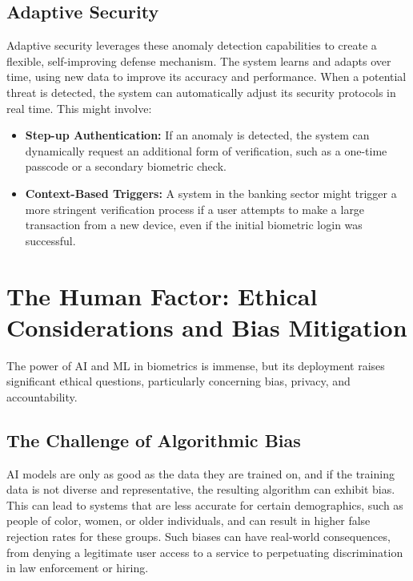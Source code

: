 \subsection{Adaptive Security}

Adaptive security leverages these anomaly detection capabilities to create a flexible, self-improving defense mechanism. The system learns and adapts over time, using new data to improve its accuracy and performance. When a potential threat is detected, the system can automatically adjust its security protocols in real time. This might involve:

\begin{itemize}
    \item \textbf{Step-up Authentication:} If an anomaly is detected, the system can dynamically request an additional form of verification, such as a one-time passcode or a secondary biometric check.
    \item \textbf{Context-Based Triggers:} A system in the banking sector might trigger a more stringent verification process if a user attempts to make a large transaction from a new device, even if the initial biometric login was successful.
\end{itemize}

\section{The Human Factor: Ethical Considerations and Bias Mitigation}

The power of AI and ML in biometrics is immense, but its deployment raises significant ethical questions, particularly concerning bias, privacy, and accountability.

\subsection{The Challenge of Algorithmic Bias}

AI models are only as good as the data they are trained on, and if the training data is not diverse and representative, the resulting algorithm can exhibit bias. This can lead to systems that are less accurate for certain demographics, such as people of color, women, or older individuals, and can result in higher false rejection rates for these groups. Such biases can have real-world consequences, from denying a legitimate user access to a service to perpetuating discrimination in law enforcement or hiring.

